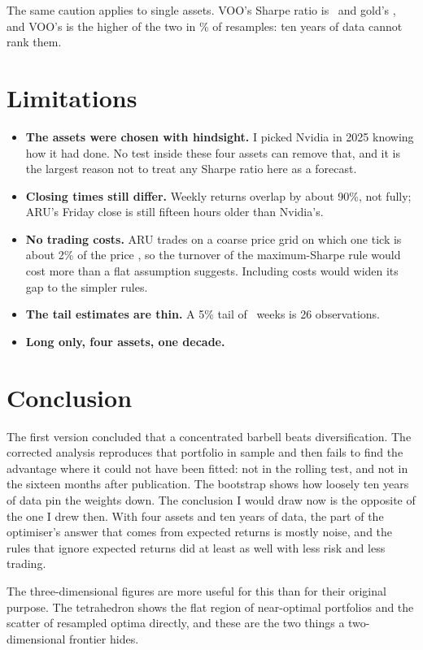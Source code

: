 \documentclass[11pt,a4paper]{article}
\begin{document}
The same caution applies to single assets. VOO's Sharpe ratio is \srVoo\ and gold's \srSgln, and VOO's is the higher of the two in \bootVooSglnShare\% of resamples: ten years of data cannot rank them.

\section{Limitations}

\begin{itemize}
\item \textbf{The assets were chosen with hindsight.} I picked Nvidia in 2025 knowing how it had done. No test inside these four assets can remove that, and it is the largest reason not to treat any Sharpe ratio here as a forecast.
\item \textbf{Closing times still differ.} Weekly returns overlap by about 90\%, not fully; ARU's Friday close is still fifteen hours older than Nvidia's.
\item \textbf{No trading costs.} ARU trades on a coarse price grid on which one tick is about 2\% of the price \citep{tok}, so the turnover of the maximum-Sharpe rule would cost more than a flat assumption suggests. Including costs would widen its gap to the simpler rules.
\item \textbf{The tail estimates are thin.} A 5\% tail of \nWeeks\ weeks is 26 observations.
\item \textbf{Long only, four assets, one decade.}
\end{itemize}

\section{Conclusion}

The first version concluded that a concentrated barbell beats diversification. The corrected analysis reproduces that portfolio in sample and then fails to find the advantage where it could not have been fitted: not in the rolling test, and not in the sixteen months after publication. The bootstrap shows how loosely ten years of data pin the weights down. The conclusion I would draw now is the opposite of the one I drew then. With four assets and ten years of data, the part of the optimiser's answer that comes from expected returns is mostly noise, and the rules that ignore expected returns did at least as well with less risk and less trading.

The three-dimensional figures are more useful for this than for their original purpose. The tetrahedron shows the flat region of near-optimal portfolios and the scatter of resampled optima directly, and these are the two things a two-dimensional frontier hides.
\end{document}
